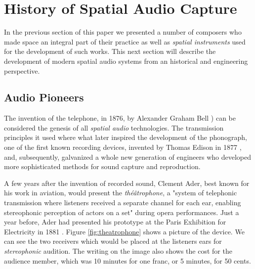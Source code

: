 \section{History of Spatial Audio Capture}

In the previous section of this paper we presented a number of composers who made space an integral part of their practice as well as \textit{spatial instruments} used for the development of such works. This next section will describe the development of modern spatial audio systems from an historical and engineering perspective. 




\subsection{Audio Pioneers} \label{subsec:audio_pioneers}

The invention of the telephone, in 1876, by  Alexander Graham Bell \cite{grosvenor2016alexander}) can be considered the genesis of all \textit{spatial audio} technologies. The transmission principles it used where what later inspired the development of the phonograph, one of the first known recording devices, invented by Thomas Edison in 1877 \cite{gitelman1999scripts}, and, subsequently, galvanized a whole new generation of engineers who developed more sophisticated methods for sound capture and reproduction. 

A few years after the invention of recorded sound, Clement Ader, best known for his work in  aviation, would present the \textit{théâtrophone}, a "system of telephonic transmission where listeners received a separate channel for each ear, enabling stereophonic perception of actors on a set" during opera performances. Just a year before, Ader had presented his prototype at the Paris Exhibition for Electricity in 1881 \cite{malham19953}. Figure  \ref{fig:theatrophone} shows a picture of the device. We can see the two receivers which would be placed at the listeners ears for \textit{stereophonic} audition. The writing on the image also shows the cost for the audience member, which was 10 minutes for one franc, or 5 minutes, for 50 cents. 

